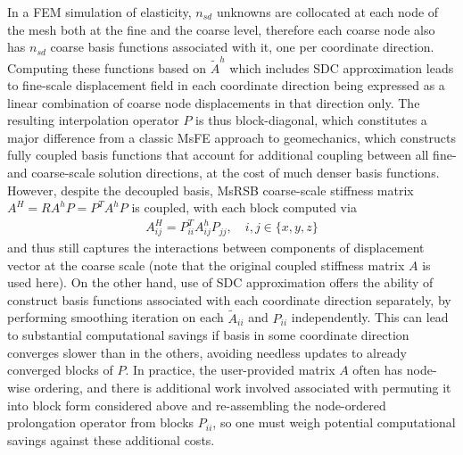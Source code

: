 In a FEM simulation of elasticity, $n_{sd}$ unknowns are collocated at each node of the mesh both at the fine and the coarse level, therefore each coarse node also has $n_{sd}$ coarse basis functions associated with it, one per coordinate direction.   Computing these functions based on $\tilde{A}^h$ which includes SDC approximation leads to fine-scale displacement field in each coordinate direction being expressed as a linear combination of coarse node displacements in that direction only.   The resulting interpolation operator $P$ is thus block-diagonal, which constitutes a major difference from a classic MsFE approach to geomechanics, which constructs fully coupled basis functions \cite{Castelletto2017} that account for additional coupling between all fine- and coarse-scale solution directions, at the cost of much denser basis functions.   However, despite the decoupled basis, MsRSB coarse-scale stiffness matrix $A^H = R A^h P = P^T A^h P$ is coupled, with each block computed via
\begin{align}
A^H_{ij} = P^T_{ii} A_{ij}^h P_{jj}, \quad i,j \in \{x,y,z\}
\end{align}
and thus still captures the interactions between components of displacement vector at the coarse scale (note that the original coupled stiffness matrix $A$ is used here).   On the other hand, use of SDC approximation offers the ability of construct basis functions associated with each coordinate direction separately, by performing smoothing iteration on each $\tilde{A}_{ii}$ and $P_{ii}$ independently.   This can lead to substantial computational savings if basis in some coordinate direction converges slower than in the others, avoiding needless updates to already converged blocks of $P$.   In practice, the user-provided matrix $A$ often has node-wise ordering, and there is additional work involved associated with permuting it into block form considered above and re-assembling the node-ordered prolongation operator from blocks $P_{ii}$, so one must weigh potential computational savings against these additional costs.

